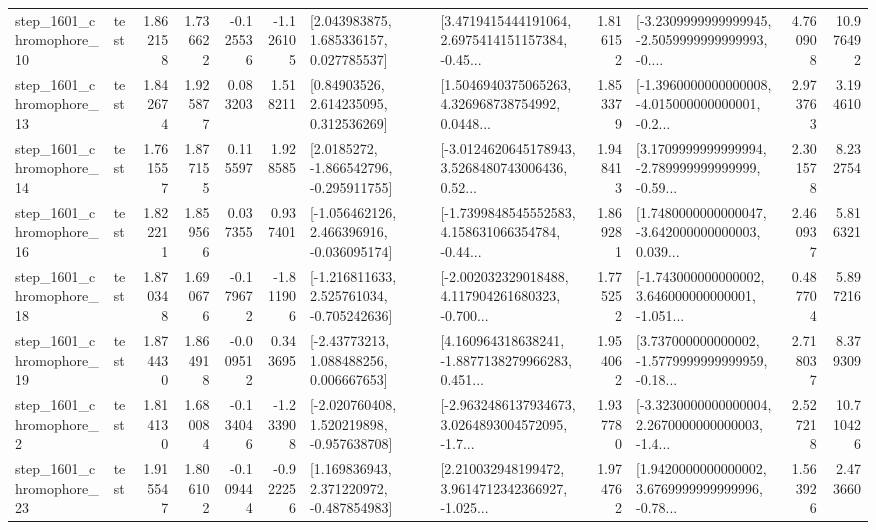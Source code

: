\begin{tabular}{llrrrrllrlrr}
 step\_1601\_chromophore\_10 &      test &      1.862158 &    1.736622 &     -0.125536 & -1.126105 &     [2.043983875, 1.685336157, 0.027785537] &  [3.4719415444191064, 2.6975414151157384, -0.45... &       1.816152 &  [-3.2309999999999945, -2.5059999999999993, -0.... &            4.760908 &         10.976492 \\
 step\_1601\_chromophore\_13 &      test &      1.842674 &    1.925877 &      0.083203 &  1.518211 &      [0.84903526, 2.614235095, 0.312536269] &  [1.5046940375065263, 4.326968738754992, 0.0448... &       1.853379 &  [-1.3960000000000008, -4.015000000000001, -0.2... &            2.973763 &          3.194610 \\
 step\_1601\_chromophore\_14 &      test &      1.761557 &    1.877155 &      0.115597 &  1.928585 &     [2.0185272, -1.866542796, -0.295911755] &  [-3.0124620645178943, 3.5268480743006436, 0.52... &       1.948413 &  [3.1709999999999994, -2.789999999999999, -0.59... &            2.301578 &          8.232754 \\
 step\_1601\_chromophore\_16 &      test &      1.822211 &    1.859566 &      0.037355 &  0.937401 &   [-1.056462126, 2.466396916, -0.036095174] &  [-1.7399848545552583, 4.158631066354784, -0.44... &       1.869281 &  [1.7480000000000047, -3.642000000000003, 0.039... &            2.460937 &          5.816321 \\
 step\_1601\_chromophore\_18 &      test &      1.870348 &    1.690676 &     -0.179672 & -1.811906 &   [-1.216811633, 2.525761034, -0.705242636] &  [-2.002032329018488, 4.117904261680323, -0.700... &       1.775252 &  [-1.743000000000002, 3.646000000000001, -1.051... &            0.487704 &          5.897216 \\
 step\_1601\_chromophore\_19 &      test &      1.874430 &    1.864918 &     -0.009512 &  0.343695 &     [-2.43773213, 1.088488256, 0.006667653] &  [4.160964318638241, -1.8877138279966283, 0.451... &       1.954062 &  [3.737000000000002, -1.5779999999999959, -0.18... &            2.718037 &          8.379309 \\
  step\_1601\_chromophore\_2 &      test &      1.814130 &    1.680084 &     -0.134046 & -1.233908 &   [-2.020760408, 1.520219898, -0.957638708] &  [-2.9632486137934673, 3.0264893004572095, -1.7... &       1.937780 &  [-3.3230000000000004, 2.2670000000000003, -1.4... &            2.527218 &         10.710426 \\
 step\_1601\_chromophore\_23 &      test &      1.915547 &    1.806102 &     -0.109444 & -0.922256 &    [1.169836943, 2.371220972, -0.487854983] &  [2.210032948199472, 3.9614712342366927, -1.025... &       1.974762 &  [1.9420000000000002, 3.6769999999999996, -0.78... &            1.563926 &          2.473660 \\

\end{tabular}
